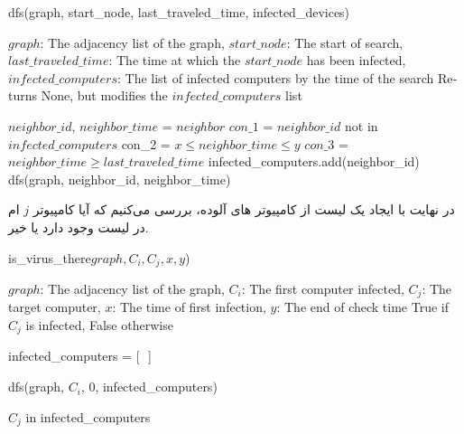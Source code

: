 \documentclass{article}
\begin{document}
\begin{latin}
    \begin{algorithm}[H]
    \caption{dfs(graph, start\_node, last\_traveled\_time, infected\_devices)}
        \begin{algorithmic}
            \Require $graph$: The adjacency list of the graph, $start\_node$: The start of search, $last\_traveled\_time$: The time at which the $start\_node$ has been infected, $infected\_computers$: The list of infected computers by the time of the search
            \Ensure Returns None, but modifies the $infected\_computers$ list
            
                \State $neighbor\_id$, $neighbor\_time$ = $neighbor$
                \State $con\_1$ = $neighbor\_id$ not in $infected\_computers$
                \State con\_2 = $x \leq neighbor\_time \leq y$
                \State $con\_3$ = $neighbor\_time \geq last\_traveled\_time$
                        \State infected\_computers.add(neighbor\_id)
                        \State dfs(graph, neighbor\_id, neighbor\_time)
                    \EndIf
            \EndFor
        \end{algorithmic}
    \end{algorithm}
\end{latin}

                    


در نهایت با ایجاد یک لیست از کامپیوتر های آلوده، بررسی می‌کنیم که آیا کامپیوتر 
$j$
ام در لیست وجود دارد یا خیر.

\begin{latin}
    \begin{algorithm}[H]
    \caption{is\_virus\_there$graph, C_i, C_j, x, y$)}
        \begin{algorithmic}
            \Require $graph$: The adjacency list of the graph, $C_i$: The first computer infected, $C_j$: The target computer, $x$: The time of first infection, $y$: The end of check time
            \Ensure True if $C_j$ is infected, False otherwise
            
            \State infected\_computers = [\, \,]
            
            \State dfs(graph, $C_i$, 0, infected\_computers)
                
            \State $C_j$ in infected\_computers
        \end{algorithmic}
    \end{algorithm}
\end{latin}
\end{document}
